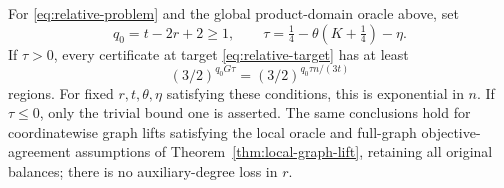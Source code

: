 \begin{theorem}
\label{thm:relative-cover}
For \eqref{eq:relative-problem} and the global product-domain oracle
above, set
\begin{equation}\label{eq:relative-parameters}
 q_0=t-2r+2\ge1,\qquad
 \tau=\tfrac14-\theta(K+\tfrac14)-\eta.
\end{equation}
If $\tau>0$, every certificate at target
\eqref{eq:relative-target} has at least
\begin{equation}\label{eq:relative-cover-bound}
 (3/2)^{q_0G\tau}=(3/2)^{q_0\tau n/(3t)}
\end{equation}
regions. For fixed $r,t,\theta,\eta$ satisfying these conditions, this
is exponential in $n$. If $\tau\le0$, only the trivial bound one is
asserted. The same conclusions hold for coordinatewise graph lifts
satisfying the local oracle and full-graph objective-agreement assumptions
of Theorem~\ref{thm:local-graph-lift}, retaining all original balances;
there is no auxiliary-degree loss in $r$.
\end{theorem}
